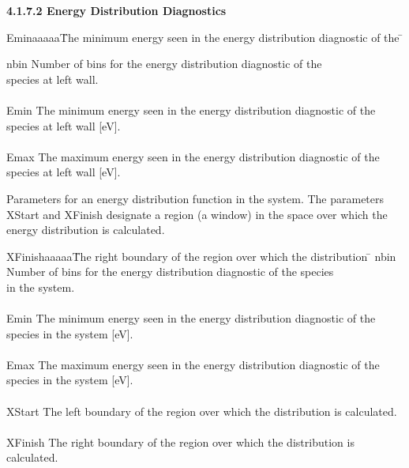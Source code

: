 \begin{section}
\begin{subsection}
\begin{subsubsection}
\noindent
{\bf 4.1.7.2 Energy Distribution Diagnostics} \\

\begin{tabbing}
         Eminaaaaa\= The minimum energy seen in the energy distribution
diagnostic of the \= \kill

        nbin \> Number of bins for the energy distribution diagnostic
of the \> \\ 	 \> species at left wall. \> \\
\\ Emin \> The minimum energy seen in the energy distribution
diagnostic of the \> \\ 	 \> species at left wall [eV]. \> \\
\\ Emax \> The maximum energy seen in the energy distribution
diagnostic of the \> \\ 	 \> species at left wall [eV]. \>
\end{tabbing}

\noindent
Parameters for an energy distribution function in the system.
The parameters XStart and XFinish designate a region (a window) in the
space over which the energy distribution is calculated.

\begin{tabbing}
       XFinishaaaaa\= The right boundary of the region over which the
distribution \= \kill
         nbin \> Number of bins for the energy distribution diagnostic
of the species \> \\ 		\> 	in the system. \> \\
\\	 Emin \> The minimum energy seen in the energy distribution
diagnostic of the \> \\ 	 \>	species in the system [eV]. \>
\\ 				\\ Emax \> The maximum energy seen in
the energy distribution diagnostic of the \> \\
\>	species in the system [eV].	\> \\
\\ XStart \> The left boundary of the region over which the
distribution is calculated. \> \\ 				\\
XFinish \> The right boundary of the region over which the
distribution is calculated. \> \\
\end{tabbing}


\end{subsubsection}
\end{subsection}
\end{section}
